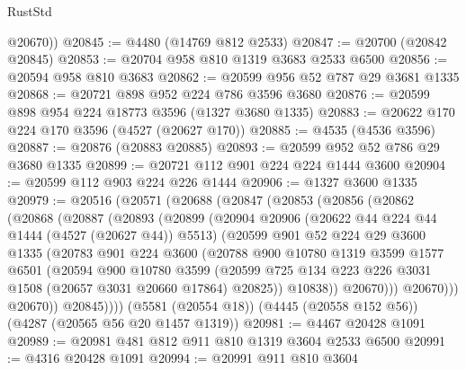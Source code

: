 \begin{lexlean}{RustStd}
\begin{coremodule}
        @20670))
@20845 := @4480 (@14769 @812 @2533)
@20847 := @20700 (@20842 @20845)
@20853 := @20704 @958 @810 @1319 @3683 @2533 @6500
@20856 := @20594 @958 @810 @3683
@20862 := @20599 @956 @52 @787 @29 @3681 @1335
@20868 := @20721 @898 @952 @224 @786 @3596 @3680
@20876 := @20599 @898 @954 @224 @18773 @3596 (@1327 @3680 @1335)
@20883 := @20622 @170 @224 @170 @3596 (@4527 (@20627 @170))
@20885 := @4535 (@4536 @3596)
@20887 := @20876 (@20883 @20885)
@20893 := @20599 @952 @52 @786 @29 @3680 @1335
@20899 := @20721 @112 @901 @224 @224 @1444 @3600
@20904 := @20599 @112 @903 @224 @226 @1444
@20906 := @1327 @3600 @1335
@20979 := @20516
    (@20571
      (@20688
        (@20847
          (@20853
            (@20856
              (@20862
                (@20868
                  (@20887
                    (@20893
                      (@20899
                        (@20904
                          @20906
                          (@20622 @44 @224 @44 @1444 (@4527 (@20627 @44)) @5513)
                          (@20599
                            @901
                            @52
                            @224
                            @29
                            @3600
                            @1335
                            (@20783
                              @901
                              @224
                              @3600
                              (@20788
                                @900
                                @10780
                                @1319
                                @3599
                                @1577
                                @6501
                                (@20594
                                  @900
                                  @10780
                                  @3599
                                  (@20599
                                    @725
                                    @134
                                    @223
                                    @226
                                    @3031
                                    @1508
                                    (@20657 @3031 @20660 @17864)
                                    @20825))
                                @10838))
                            @20670)))
                      @20670)))
                @20670))
            @20845))))
    (@5581 (@20554 @18))
    (@4445 (@20558 @152 @56))
    (@4287 (@20565 @56 @20 @1457 @1319))
@20981 := @4467 @20428 @1091
@20989 := @20981 @481 @812 @911 @810 @1319 @3604 @2533 @6500
@20991 := @4316 @20428 @1091
@20994 := @20991 @911 @810 @3604

\end{coremodule}
\end{lexlean}
